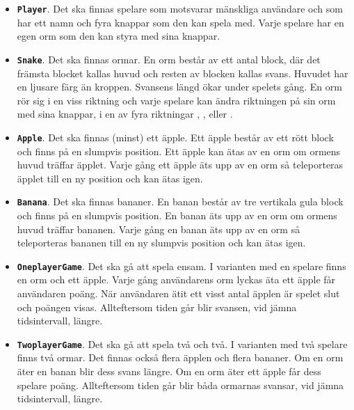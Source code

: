 \begin{itemize}[nosep, label={$\square$},]
\item \textbf{\texttt{Player}}. Det ska finnas spelare som motsvarar mänskliga användare och som har ett namn och fyra knappar som den kan spela med. Varje spelare har en egen orm som den kan styra med sina knappar.

\item \textbf{\texttt{Snake}}. Det ska finnas ormar. En orm består av ett antal block, där det främsta blocket kallas huvud och resten av blocken kallas svans. Huvudet har en ljusare färg än kroppen. Svansens längd ökar under spelets gång. En orm rör sig i en viss riktning och varje spelare kan ändra riktningen på sin orm med sina knappar, i en av fyra riktningar , ,  eller .

\item \textbf{\texttt{Apple}}. Det ska finnas (minst) ett äpple. Ett äpple består av ett rött block och finns på en slumpvis position. Ett äpple kan ätas av en orm om ormens huvud träffar äpplet. Varje gång ett äpple äts upp av en orm så teleporteras äpplet till en ny position och kan ätas igen.

\item \textbf{\texttt{Banana}}. Det ska finnas bananer. En banan består av tre vertikala gula block och finns på en slumpvis position. En banan äts upp av en orm om ormens huvud träffar bananen. Varje gång en banan äts upp av en orm så teleporteras bananen till en ny slumpvis position och kan ätas igen.

\item \textbf{\texttt{OneplayerGame}}. Det ska gå att spela ensam. I varianten med en spelare finns en orm och ett äpple. Varje gång användarens orm lyckas äta ett äpple får användaren poäng. När användaren ätit ett visst antal äpplen är spelet slut och poängen visas. Allteftersom tiden går blir svansen, vid jämna tidsintervall, längre.

\item \textbf{\texttt{TwoplayerGame}}. Det ska gå att spela två och två. I varianten med två spelare finns två ormar. Det finnas också flera äpplen och flera bananer. Om en orm äter en banan blir dess svans längre. Om en orm äter ett äpple får dess spelare poäng. Allteftersom tiden går blir båda ormarnas svansar, vid jämna tidsintervall, längre.

\end{itemize}
